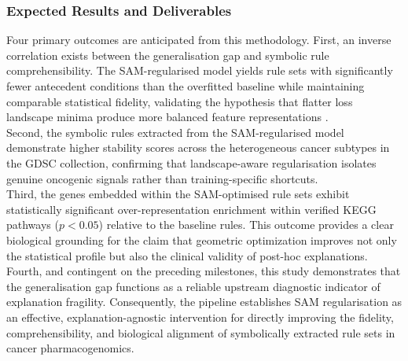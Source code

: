 \subsubsection{Expected Results and Deliverables}
\label{ssub:method_expected_results}
Four primary outcomes are anticipated from this methodology. First, an inverse 
correlation exists between the generalisation gap and symbolic rule comprehensibility. 
The SAM-regularised model yields rule sets with significantly fewer antecedent 
conditions than the overfitted baseline while maintaining comparable statistical 
fidelity, validating the hypothesis that flatter loss landscape minima produce more 
balanced feature representations \cite{Springer2024}. 
\\
Second, the symbolic rules extracted from the SAM-regularised model demonstrate 
higher stability scores across the heterogeneous cancer subtypes in the GDSC 
collection, confirming that landscape-aware regularisation isolates genuine 
oncogenic signals rather than training-specific shortcuts. 
\\
Third, the genes embedded within the SAM-optimised rule sets exhibit statistically 
significant over-representation enrichment within verified KEGG pathways ($p < 0.05$) 
relative to the baseline rules. This outcome provides a clear biological grounding 
for the claim that geometric optimization improves not only the statistical profile 
but also the clinical validity of post-hoc explanations. 
\\
Fourth, and contingent on the preceding milestones, this study demonstrates that 
the generalisation gap functions as a reliable upstream diagnostic indicator of 
explanation fragility. Consequently, the pipeline establishes SAM regularisation as 
an effective, explanation-agnostic intervention for directly improving the fidelity, 
comprehensibility, and biological alignment of symbolically extracted rule sets in 
cancer pharmacogenomics.